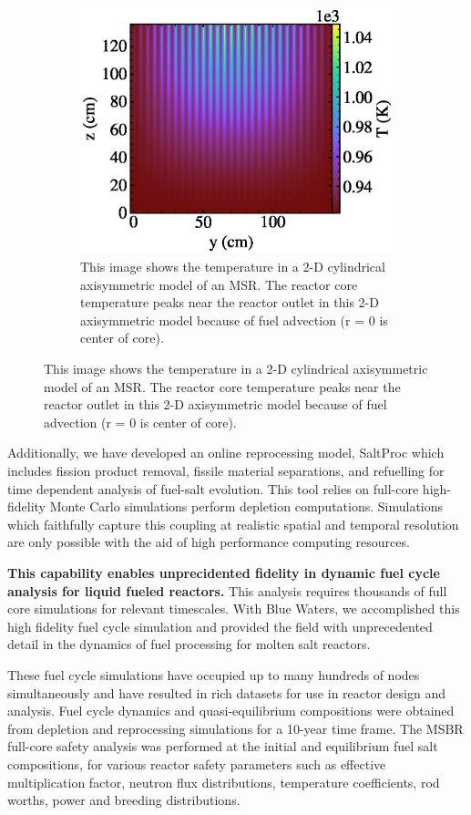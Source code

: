 \documentclass[letterpaper]{article}
\begin{document}
\begin{figure}[htb]
\begin{subfigure}{0.4\textwidth}
        \begin{center}
                \includegraphics[width=\textwidth]{temp.eps}
        \end{center}
        \caption{This image shows the temperature in a 2-D cylindrical 
        axisymmetric model of an MSR. The reactor core temperature peaks near 
the reactor outlet in this 2-D axisymmetric model because of fuel advection (r 
= 0 is center of core).}%
        \label{fig:temp}
        \end{subfigure}%
\end{figure}


Additionally, we have developed
an online reprocessing model, SaltProc which includes fission product removal, fissile material
separations, and refuelling for time dependent analysis of fuel-salt evolution.
This tool relies on full-core high-fidelity Monte Carlo simulations perform depletion
computations. Simulations which faithfully capture this coupling at realistic spatial and
temporal resolution are only possible with the aid of high performance
computing resources.

\textbf{This capability enables unprecidented fidelity in dynamic fuel cycle 
analysis for liquid fueled reactors.} This analysis requires thousands of full 
core simulations for relevant timescales. With Blue Waters, we accomplished 
this high fidelity fuel cycle simulation and provided the field with 
unprecedented detail in the dynamics of fuel processing for molten salt 
reactors. 

These fuel cycle simulations have occupied up to many hundreds of nodes
simultaneously and have resulted in rich datasets for use in reactor design and
analysis.  Fuel cycle dynamics and quasi-equilibrium compositions were obtained
from depletion and reprocessing simulations for a 10-year time frame. The MSBR
full-core safety analysis was performed at the initial and equilibrium fuel
salt compositions, for various reactor safety parameters such as effective
multiplication factor, neutron flux distributions, temperature coefficients,
rod worths, power and breeding distributions.
\end{document}
